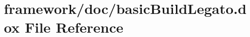 \hypertarget{basic_build_legato_8dox}{}\section{framework/doc/basic\+Build\+Legato.dox File Reference}
\label{basic_build_legato_8dox}
